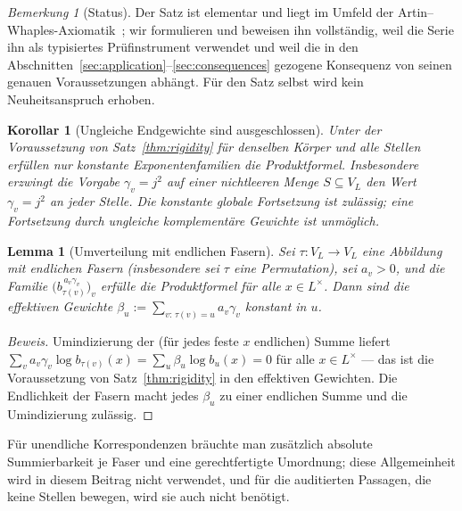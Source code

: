 \documentclass[11pt,a4paper]{article}
\newtheorem{lemma}[theorem]{Lemma}
\newtheorem{corollary}[theorem]{Korollar}
\theoremstyle{definition}
\theoremstyle{remark}
\newtheorem{remark}[theorem]{Bemerkung}
\begin{document}
\begin{remark}[Status]\label{rem:status}
Der Satz ist elementar und liegt im Umfeld der Artin--Whaples-Axiomatik~\cite{artinwhaples}; wir formulieren und beweisen ihn vollständig, weil die
Serie ihn als typisiertes Prüfinstrument verwendet und weil die in den
Abschnitten~\ref{sec:application}--\ref{sec:consequences} gezogene Konsequenz
von seinen genauen Voraussetzungen abhängt. Für den Satz selbst wird kein
Neuheitsanspruch erhoben.
\end{remark}

\begin{corollary}[Ungleiche Endgewichte sind ausgeschlossen]\label{cor:noselect}
Unter der Voraussetzung von Satz~\ref{thm:rigidity} für denselben Körper
und alle Stellen erfüllen nur konstante Exponentenfamilien die Produktformel.
Insbesondere erzwingt die Vorgabe $\gamma_v=j^2$ auf einer nichtleeren Menge
$S\subseteq V_L$ den Wert $\gamma_v=j^2$ an jeder Stelle.
Die konstante globale Fortsetzung ist zulässig; eine Fortsetzung durch
ungleiche komplementäre Gewichte ist unmöglich.
\end{corollary}

\begin{lemma}[Umverteilung mit endlichen Fasern]\label{lem:redistribution}
Sei $\tau : V_L \to V_L$ eine Abbildung mit endlichen Fasern (insbesondere sei
$\tau$ eine Permutation), sei $a_v > 0$, und die Familie
$\bigl(b_{\tau(v)}^{\,a_v \gamma_v}\bigr)_{v}$ erfülle die Produktformel für
alle $x \in L^\times$. Dann sind die effektiven Gewichte
$\beta_u := \sum_{v :\, \tau(v) = u} a_v \gamma_v$ konstant in $u$.
\end{lemma}

\begin{proof}[Beweis]
Umindizierung der (für jedes feste $x$ endlichen) Summe liefert
$\sum_v a_v\gamma_v \log b_{\tau(v)}(x) = \sum_u \beta_u \log b_u(x) = 0$ für
alle $x \in L^\times$ --- das ist die Voraussetzung von
Satz~\ref{thm:rigidity} in den effektiven Gewichten. Die Endlichkeit der
Fasern macht jedes $\beta_u$ zu einer endlichen Summe und die Umindizierung
zulässig.
\end{proof}

Für unendliche Korrespondenzen bräuchte man zusätzlich absolute
Summierbarkeit je Faser und eine gerechtfertigte Umordnung; diese
Allgemeinheit wird in diesem Beitrag nicht verwendet, und für die auditierten
Passagen, die keine Stellen bewegen, wird sie auch nicht benötigt.

\end{document}
